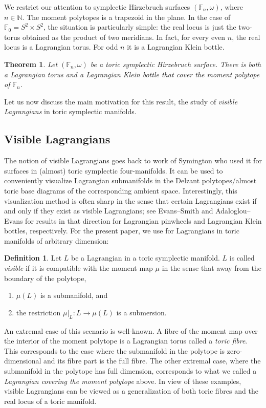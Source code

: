 \documentclass[10pt,oneside,reqno]{amsart}
\newtheorem{theoremletter}{Theorem}
\theoremstyle{definition}
\newtheorem{definition}[theorem]{Definition}
\newcommand{\N}{\mathbb{N}}
\newcommand{\F}{\mathbb{F}}
\begin{document}
We restrict our attention to symplectic Hirzebruch surfaces $(\F_n,\omega)$, where $n \in \N$. The moment polytopes is a trapezoid in the plane. In the case of $\F_0 = S^2 \times S^2$, the situation is particularly simple: the real locus is just the two-torus obtained as the product of two meridians. In fact, for every even $n$, the real locus is a Lagrangian torus. For odd $n$ it is a Lagrangian Klein bottle. 

\begin{theoremletter}
    \label{thm:mainA}
    Let $(\F_n,\omega)$ be a toric symplectic Hirzebruch surface. There is both a Lagrangian torus and a Lagrangian Klein bottle that cover the moment polytope of $\F_n$. 
\end{theoremletter}

Let us now discuss the main motivation for this result, the study of \emph{visible Lagrangians} \cite[Chapter 5]{evans2023lectures} in toric symplectic manifolds.



\subsection{Visible Lagrangians}
The notion of visible Lagrangians goes back to work of Symington \cite{symington2003fourtwo} who used it for surfaces in (almost) toric symplectic four-manifolds. It can be used to conveniently visualize Lagrangian submanifolds in the Delzant polytopes/almost toric base diagrams of the corresponding ambient space. Interestingly, this visualization method is often sharp in the sense that certain Lagrangians exist if and only if they exist as visible Lagrangians; see Evans--Smith \cite{EvansSmith2018} and Adaloglou--Evans \cite{adaloglou2024klein} for results in that direction for Lagrangian pinwheels and Lagrangian Klein bottles, respectively. For the present paper, we use \cite[Definition 5.2]{evans2023lectures} for Lagrangians in toric manifolds of arbitrary dimension:
\begin{definition}
    Let $L$ be a Lagrangian in a toric symplectic manifold. $L$ is called \emph{visible} if it is compatible with the moment map $\mu$ in the sense that away from the boundary of the polytope, 
\begin{enumerate}
    \item $\mu(L)$ is a submanifold, and
    \item the restriction $\mu\vert_L \colon L \rightarrow \mu(L)$ is a submersion.
\end{enumerate} 
\end{definition}
An extremal case of this scenario is well-known. A fibre of the moment map over the interior of the moment polytope is a Lagrangian torus called a \emph{toric fibre}. This corresponds to the case where the submanifold in the polytope is zero-dimensional and its fibre part is the full fibre. The other extremal case, where the submanifold in the polytope has full dimension, corresponds to what we called a \emph{Lagrangian covering the moment polytope} above. In view of these examples, visible Lagrangians can be viewed as a generalization of both toric fibres and the real locus of a toric manifold.
\end{document}
